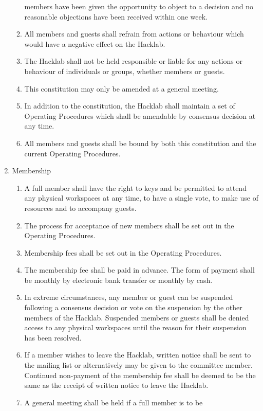 \documentclass{article}
\begin{document}
\begin{enumerate}
\begin{enumerate}
      members have been given the opportunity to object to a decision
      and no reasonable objections have been received within one week.
    \item All members and guests shall refrain from actions or
      behaviour which would have a negative effect on the Hacklab.
    \item The Hacklab shall not be held responsible or liable for
      any actions or behaviour of individuals or groups, whether
      members or guests.
    \item This constitution may only be amended at a general meeting.
    \item In addition to the constitution, the Hacklab shall maintain
      a set of Operating Procedures which shall be amendable by
      consensus decision at any time.
    \item All members and guests shall be bound by both this
      constitution and the current Operating Procedures.
    \end{enumerate} %
  \item Membership
    \begin{enumerate}
    \item A full member shall have the right to keys and be permitted
      to attend any physical workspaces at any time, to have a single
      vote, to make use of resources and to accompany guests.
    \item The process for acceptance of new members shall be set out
      in the Operating Procedures.
    \item Membership fees shall be set out in the Operating Procedures.
    \item The membership fee shall be paid in advance. The form of
      payment shall be monthly by electronic bank transfer or monthly
      by cash.
    \item In extreme circumstances, any member or guest can be
      suspended following a consensus decision or vote on the
      suspension by the other members of the Hacklab. Suspended members
      or guests shall be denied access to any physical workspaces
      until the reason for their suspension has been resolved.
    \item If a member wishes to leave the Hacklab, written notice
      shall be sent to the mailing list or alternatively may be given
      to the committee member. Continued non-payment of the membership
      fee shall be deemed to be the same as the receipt of written
      notice to leave the Hacklab.
    \item A general meeting shall be held if a full member is to be

\end{enumerate}
\end{enumerate}
\end{document}
